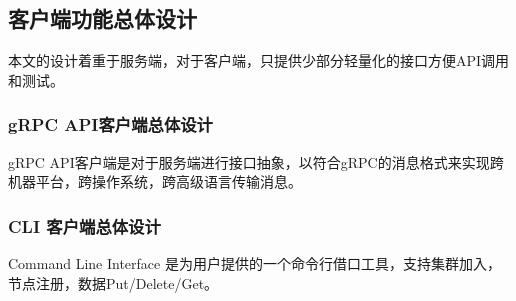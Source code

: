     \subsection{客户端功能总体设计}

         本文的设计着重于服务端，对于客户端，只提供少部分轻量化的接口方便API调用和测试。

        \subsubsection{gRPC API客户端总体设计}
        
        gRPC API客户端是对于服务端进行接口抽象，以符合gRPC的消息格式来实现跨机器平台，跨操作系统，跨高级语言传输消息。
        \subsubsection{CLI 客户端总体设计}
    
        Command Line Interface 是为用户提供的一个命令行借口工具，支持集群加入，节点注册，数据Put/Delete/Get。

\clearpage